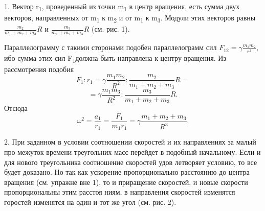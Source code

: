 \documentclass[kvant.tex]{subfiles}
\begin{document}
1. Вектор r\textsubscript{1}, проведенный из точки m\textsubscript{1} в центр вращения, есть сумма двух векторов, направленных от m\textsubscript{1} к m\textsubscript{2} и от m\textsubscript{1} к m\textsubscript{3}. Модули этих векторов равны \(\frac{m_2}{m_1+m_2+m_3}R\) и \(\frac{m_3}{m_1+m_2+m_3}R\) (см. рис. 1).\par
Параллелограмму с такими сторонами подобен параллелограмм сил \(F_{12} = \gamma\frac{m_1m_2}{r^2}\), ибо сумма этих сил F\textsubscript{1}должна быть направлена к центру вращения. Из рассмотрения подобия
\[F_1: r_1 = \gamma\frac{m_1m_2}{R^2}:\frac{m_2}{m_1+m_2+m_3}R =\]\[ = \gamma\frac{m_1m_3}{R^2}:\frac{m_3}{m_1+m_2+m_3}R.\]
Отсюда
\[\omega^2 = \frac{a_1}{r_1} = \frac{F_1}{m_1r_1} = \gamma\frac{m_1+m_2+m_3}{R^3}.\]\par
2. При заданном в условии соотношении скоростей и их направлениях за малый про-межуток времени треугольних масс перейдет в подобный начальному. Если и для нового треугольника соотношение скоростей удов летворяет условию, то все будет доказано. Но так как ускорение пропорционально расстоянию до центра вращения (см. упражне вне 1), то и приращение скоростей, и новые скорости пропорциональны этим расстоя ниям, в направления скоростей изменятся горостей изменятся на один и тот же угол (см. рис. 2).
\end{document}
